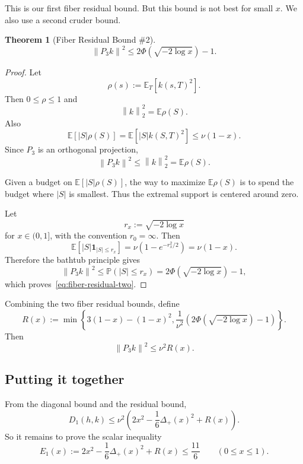 \documentclass[11pt]{article}
\newtheorem{theorem}{Theorem}[section]
\numberwithin{equation}{section}
\newcommand{\E}{\mathbb E}
\newcommand{\norm}[1]{\left\|#1\right\|}
\newcommand{\one}{\mathbf 1}
\newcommand{\PhiG}{\Phi}
\begin{document}
This is our first fiber residual bound. But this bound is not best for small $x$. We also use a second cruder bound.

\begin{theorem}[Fiber Residual Bound \#2]
    \begin{equation}
        \norm{P_3k}^2
        \le
        2\PhiG(\sqrt{-2\log x})-1.
        \label{eq:fiber-residual-two}
\end{equation}
\end{theorem}

\begin{proof}
Let
\[
        \rho(s):=\E_T[k(s,T)^2].
\]
Then $0\le\rho\le1$ and
\[
        \norm{k}^2_2=\E\rho(S).
\]
Also
\[
        \E[|S|\rho(S)]=\E[|S|k(S,T)^2]\le \nu(1-x).
\]
Since $P_3$ is an orthogonal projection,
\[
        \norm{P_3k}^2\le \norm{k}^2_2=\E\rho(S).
\]

Given a budget on $\E[|S|\rho(S)]$, the way to maximize $\E\rho(S)$ is to spend the budget where $|S|$ is smallest. Thus the extremal support is centered around zero.

Let
\[
        r_x:=\sqrt{-2\log x}
\]
for $x\in(0,1]$, with the convention $r_0=\infty$. Then
\[
        \E[|S|\one_{|S|\le r_x}]=\nu(1-e^{-r_x^2/2})=\nu(1-x).
\]
Therefore the bathtub principle gives
\[
        \norm{P_3k}^2
        \le
        \mathbb P(|S|\le r_x)
        =2\PhiG(\sqrt{-2\log x})-1,
\]
which proves~\eqref{eq:fiber-residual-two}.
\end{proof}

Combining the two fiber residual bounds, define
\begin{equation}
        R(x):=
        \min\left\{
        3(1-x)-(1-x)^2,
        \frac{1}{\nu^2}\left(2\PhiG(\sqrt{-2\log x})-1\right)
        \right\}.
        \label{eq:residual-function}
\end{equation}
Then
\[
        \norm{P_3k}^2\le \nu^2R(x).
\]

\subsection{Putting it together}
\label{sec:putting-together}

From the diagonal bound and the residual bound,
\[
        D_1(h,k)
        \le
        \nu^2\left(2x^2-\frac16\Delta_+(x)^2+R(x)\right).
\]
So it remains to prove the scalar inequality
\begin{equation}
        E_1(x):=2x^2-\frac16\Delta_+(x)^2+R(x)
        \le \frac{11}{6}
        \qquad(0\le x\le1).
        \label{eq:scalar-reduction}
\end{equation}
\end{document}
